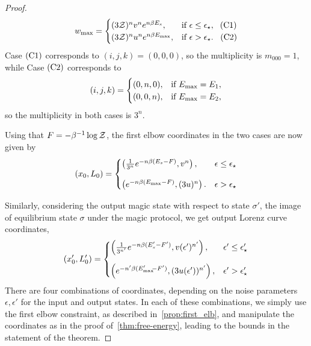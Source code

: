 \documentclass[pra,
aps,
twocolumn,
superscriptaddress,
groupedaddress,
nofootinbib,
reprint
]{revtex4-1}
\begin{document}
\begin{proof}
\begin{equation*}
w_{\rm max} =
	\begin{cases}
		(3\mathcal{Z})^{n} v^n e^{n\beta E_s}, &\mbox{if }\epsilon \leq \epsilon_{\star},\ \hspace{3pt}\rm{(C1)}\\
		(3\mathcal{Z})^{n} u^n e^{n\beta E_{\rm{max}}}, &\mbox{if }\epsilon > \epsilon_{\star}.\ \hspace{5pt}\rm{(C2)} 
	\end{cases}
\end{equation*}
Case $\rm{(C1)}$ corresponds to $(i,j,k) = (0,0,0)$, so the multiplicity is $m_{000} = 1$, while
Case $\rm{(C2)}$ corresponds to
\begin{equation}
	(i,j,k) = 
	\begin{cases}
	(0,n,0), &\text{if } E_{\rm{max}} = E_1, \\
	(0,0,n), &\text{if } E_{\rm{max}} = E_2,
	\end{cases}
\end{equation}
so the multiplicity in both cases is $3^n$.

Using that $F = -\beta^{-1} \log \mathcal{Z}$, the first elbow coordinates in the two cases are now given by
\begin{equation}\label{eq:first_elb_coords}
	(x_0, L_0) =
	\begin{cases}
		\left(\frac{1}{3^n} e^{-n\beta (E_s - F)}, v^n \right), &\epsilon \leq \epsilon_\star \vspace{10pt}\\
		\left( e^{-n\beta (E_{\rm{max}}-F)}, (3u)^n \right). &\epsilon > \epsilon_\star
	\end{cases}
\end{equation}

Similarly, considering the output magic state with respect to state $\sigma'$, the image of equilibrium state $\sigma$ under the magic protocol, we get output Lorenz curve coordinates,
\begin{equation}\label{eq:transformed_first_elb_coords}
	(x'_0, L'_0) =
	\begin{cases}
		\left(\frac{1}{3^{n'}} e^{-n\beta (E'_s - F')}, v(\epsilon')^{n'} \right), &\epsilon' \leq \epsilon'_\star \vspace{10pt}\\
		\left( e^{-n'\beta (E'_{\rm{max}}\hspace{-2.5pt}-F')}, (3u(\epsilon'))^{n'} \right), &\epsilon' > \epsilon'_\star
	\end{cases}
\end{equation}
There are four combinations of coordinates, depending on the noise parameters $\epsilon, \epsilon'$ for the input and output states.
In each of these combinations, we simply use the first elbow constraint, as described in~\cref{prop:first_elb}, and manipulate the coordinates as in the proof of~\cref{thm:free-energy}, leading to the bounds in the statement of the theorem.
\end{proof}
\end{document}

